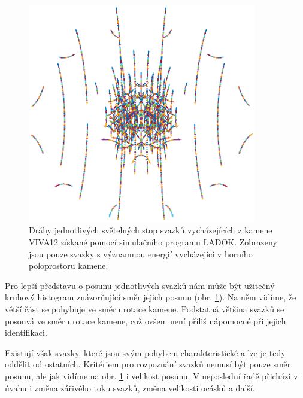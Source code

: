 \begin{figure}[h!]
\begin{center}
\includegraphics[width = 10cm]{figures/viva12_bigflux.eps}
\end{center}
\caption{Dráhy jednotlivých světelných stop svazků vycházejících z kamene VIVA12 získané pomocí simulačního programu  LADOK. Zobrazeny jsou pouze svazky s významnou energií vycházející v horního poloprostoru kamene. }

\label{fig:relativni pohyb graf}
\end{figure}

\newpage
Pro lepší představu o posunu jednotlivých svazků nám může být užitečný kruhový histogram znázorňující směr jejich posunu (obr. \ref{fig:relativni pohyb graf}). Na něm vidíme, že větší část se pohybuje ve směru rotace kamene. Podstatná většina svazků se posouvá ve směru rotace kamene, což ovšem není příliš nápomocné při jejich identifikaci.

Existují však svazky, které jsou svým pohybem charakteristické a lze je tedy oddělit od ostatních. Kritériem pro rozpoznání svazků nemusí být pouze směr posunu, ale jak vidíme na obr. \ref{fig:relativni pohyb graf} i velikost posunu. V neposlední řadě přichází v úvahu i změna zářivého toku svazků, změna velikosti ocásků a další. 

